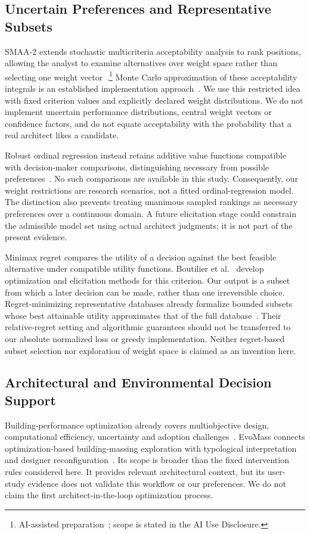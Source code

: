 \documentclass{llncs}
\newcommand{\aidraft}{\footnote{AI-assisted preparation~\cite{openai2026}; scope is stated in the AI Use Disclosure.}}
\begin{document}
\subsection{Uncertain Preferences and Representative Subsets}
SMAA-2 extends stochastic multicriteria acceptability analysis to rank positions, allowing the analyst to examine alternatives over weight space rather than selecting one weight vector~\cite{LahdelmaSalminen2001}.\aidraft{} Monte Carlo approximation of these acceptability integrals is an established implementation approach~\cite{TervonenLahdelma2007}. We use this restricted idea with fixed criterion values and explicitly declared weight distributions. We do not implement uncertain performance distributions, central weight vectors or confidence factors, and do not equate acceptability with the probability that a real architect likes a candidate.

Robust ordinal regression instead retains additive value functions compatible with decision-maker comparisons, distinguishing necessary from possible preferences~\cite{GrecoMousseauSlowinski2008}. No such comparisons are available in this study. Consequently, our weight restrictions are research scenarios, not a fitted ordinal-regression model. The distinction also prevents treating unanimous sampled rankings as necessary preferences over a continuous domain. A future elicitation stage could constrain the admissible model set using actual architect judgments; it is not part of the present evidence.

Minimax regret compares the utility of a decision against the best feasible alternative under compatible utility functions. Boutilier et al.~\cite{BoutilierEtAl2006} develop optimization and elicitation methods for this criterion. Our output is a subset from which a later decision can be made, rather than one irreversible choice. Regret-minimizing representative databases already formalize bounded subsets whose best attainable utility approximates that of the full database~\cite{NanongkaiEtAl2010}. Their relative-regret setting and algorithmic guarantees should not be transferred to our absolute normalized loss or greedy implementation. Neither regret-based subset selection nor exploration of weight space is claimed as an invention here.

\subsection{Architectural and Environmental Decision Support}
Building-performance optimization already covers multiobjective design, computational efficiency, uncertainty and adoption challenges~\cite{NguyenReiterRigo2014}. EvoMass connects optimization-based building-massing exploration with typological interpretation and designer reconfiguration~\cite{WangJanssenJi2024}. Its scope is broader than the fixed intervention rules considered here. It provides relevant architectural context, but its user-study evidence does not validate this workflow or our preferences. We do not claim the first architect-in-the-loop optimization process.
\end{document}
